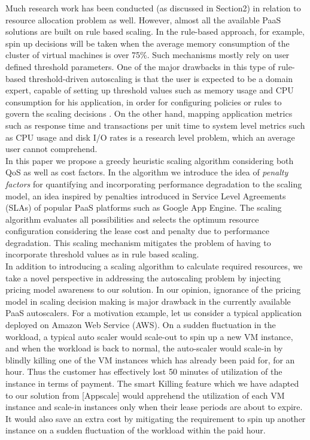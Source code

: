 Much research work has been conducted (as discussed in Section2) in relation to resource allocation problem as well. However, almost all the available PaaS solutions are built on rule based scaling. In the rule-based approach, for example, spin up decisions will be taken when the average memory consumption of the cluster of virtual machines is over 75\%. Such mechanisms mostly rely on user defined threshold parameters. One of the major drawbacks in this type of rule-based threshold-driven autoscaling is that the user is expected to be a domain expert, capable of setting up threshold values such as memory usage and CPU consumption for his application, in order for configuring policies or rules to govern the scaling decisions \cite{modeldriven}. On the other hand, mapping application metrics such as response time and transactions per unit time to system level metrics such as CPU usage and disk I/O rates is a research level problem, which an average user cannot comprehend.\\

In this paper we propose a greedy heuristic scaling algorithm considering both QoS as well as cost factors. In the algorithm we introduce the idea of \textit{penalty factors} for quantifying and incorporating performance degradation to the scaling model, an idea inspired by penalties introduced in Service Level Agreements (SLAs) of popular PaaS platforms such as Google App Engine. The scaling algorithm evaluates all possibilities and selects the optimum resource configuration considering the lease cost and penalty due to performance degradation. This scaling mechanism mitigates the problem of having to incorporate threshold values as in rule based scaling.\\

In addition to introducing a scaling algorithm to calculate required resources, we take a novel perspective in addressing the autoscaling problem by injecting pricing model awareness to our solution. In our opinion, ignorance of the pricing model in scaling decision making is major drawback in the currently available PaaS autoscalers. For a motivation example, let us consider a typical application deployed on Amazon Web Service (AWS). On a sudden fluctuation in the workload, a typical auto scaler would scale-out to spin up a new VM instance, and when the workload is back to normal, the auto-scaler would scale-in by blindly killing one of the VM instances which has already been paid for, for an hour. Thus the customer has effectively lost 50 minutes of utilization of the instance in terms of payment. The smart Killing feature which we have adapted to our solution from [Appscale] would apprehend the utilization of each VM instance and scale-in instances only when their lease periods are about to expire. It would also save an extra cost by mitigating the requirement to spin up another instance on a sudden fluctuation of the workload within the paid hour. \\

